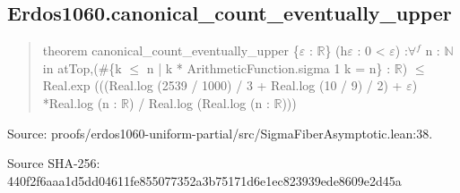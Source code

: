 \documentclass[11pt,a4paper]{article}
\begin{document}
\begin{samepage}
\subsection{Erdos1060.canonical\_count\_eventually\_upper}
\begin{quote}\small\ttfamily theorem canonical\_count\_eventually\_upper \{\ensuremath{\varepsilon} : \ensuremath{\mathbb{R}}\} (h\ensuremath{\varepsilon} : 0 < \ensuremath{\varepsilon}) :\newline     \ensuremath{\forall}\ensuremath{^{f}} n : \ensuremath{\mathbb{N}} in atTop,\newline       (\#\{k \ensuremath{\leq} n | k * ArithmeticFunction.sigma 1 k = n\} : \ensuremath{\mathbb{R}}) \ensuremath{\leq}\newline         Real.exp (((Real.log (2539 / 1000) / 3 + Real.log (10 / 9) / 2) + \ensuremath{\varepsilon}) *\newline           Real.log (n : \ensuremath{\mathbb{R}}) / Real.log (Real.log (n : \ensuremath{\mathbb{R}})))\end{quote}
{\small Source: proofs/erdos1060-uniform-partial/src/SigmaFiberAsymptotic.lean:38.\par}

{\small Source SHA-256: 440f2f6aaa1d5dd04611fe855077352a3b75171d6e1ec823939ede8609e2d45a\par}

\end{samepage}
\end{document}
